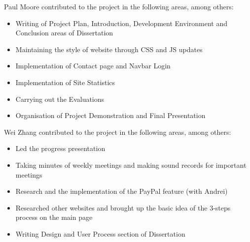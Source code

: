 \documentclass{l3proj}
\begin{document}
Paul Moore contributed to the project in the following areas, among others:
\begin{itemize}
\item{Writing of Project Plan, Introduction, Development Environment and Conclusion areas of Dissertation}
\item{Maintaining the style of website through CSS and JS updates}
\item{Implementation of Contact page and Navbar Login}
\item{Implementation of Site Statistics}
\item{Carrying out the Evaluations}
\item{Organisation of Project Demonstration and Final Presentation}
\end{itemize}
Wei Zhang contributed to the project in the following areas, among others:
\begin{itemize}
\item{Led the progress presentation}
\item{Taking minutes of weekly meetings and making sound records for important meetings}
\item{Research and the implementation of the PayPal feature (with Andrei)}
\item{Researched other websites and brought up the basic idea of the 3-steps process on the main page}
\item{Writing Design and User Process section of Dissertation}
\end{itemize}	
\end{document}
